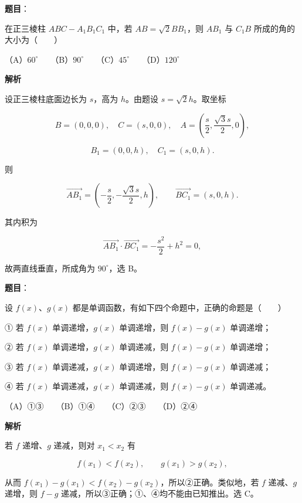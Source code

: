 \begin{answer}

\textbf{题目}：

在正三棱柱 $ABC-A_1B_1C_1$ 中，若 $AB=\sqrt2BB_1$，则 $AB_1$ 与 $C_1B$ 所成的角的大小为\mbox{（　　）}

（A）$60^\circ$　　（B）$90^\circ$　　（C）$45^\circ$　　（D）$120^\circ$

\textbf{解析}

设正三棱柱底面边长为 $s$，高为 $h$。由题设 $s=\sqrt2h$。取坐标

\nopagebreak[4]
\[
B=(0,0,0),\quad C=(s,0,0),\quad
A=\left(\frac s2,\frac{\sqrt3s}{2},0\right),
\]

\nopagebreak[4]
\[
B_1=(0,0,h),\quad C_1=(s,0,h).
\]

则

\nopagebreak[4]
\[
\overrightarrow{AB_1}=\left(-\frac s2,-\frac{\sqrt3s}{2},h\right),
\qquad
\overrightarrow{BC_1}=(s,0,h).
\]

其内积为

\nopagebreak[4]
\[
\overrightarrow{AB_1}\cdot\overrightarrow{BC_1}
=-\frac{s^2}{2}+h^2=0,
\]

故两直线垂直，所成角为 $90^\circ$，选 B。


\end{answer}
\begin{answer}

\textbf{题目}：

设 $f(x)$、$g(x)$ 都是单调函数，有如下四个命题中，正确的命题是\mbox{（　　）}

① 若 $f(x)$ 单调递增，$g(x)$ 单调递增，则 $f(x)-g(x)$ 单调递增；

② 若 $f(x)$ 单调递增，$g(x)$ 单调递减，则 $f(x)-g(x)$ 单调递增；

③ 若 $f(x)$ 单调递减，$g(x)$ 单调递增，则 $f(x)-g(x)$ 单调递减；

④ 若 $f(x)$ 单调递减，$g(x)$ 单调递减，则 $f(x)-g(x)$ 单调递减。

（A）①③　　（B）①④　　（C）②③　　（D）②④

\textbf{解析}

若 $f$ 递增、$g$ 递减，则对 $x_1<x_2$ 有

\nopagebreak[4]
\[
f(x_1)<f(x_2),\qquad g(x_1)>g(x_2),
\]

从而 $f(x_1)-g(x_1)<f(x_2)-g(x_2)$，所以②正确。类似地，若 $f$ 递减、$g$ 递增，则 $f-g$ 递减，所以③正确；①、④均不能由已知推出。选 C。


\end{answer}
